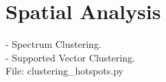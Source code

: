 \documentclass[11pt]{article}
\begin{document}
\section*{Spatial Analysis}

- Spectrum Clustering.\\
- Supported Vector Clustering.\\

File: clustering\_hotspots.py
\end{document}
